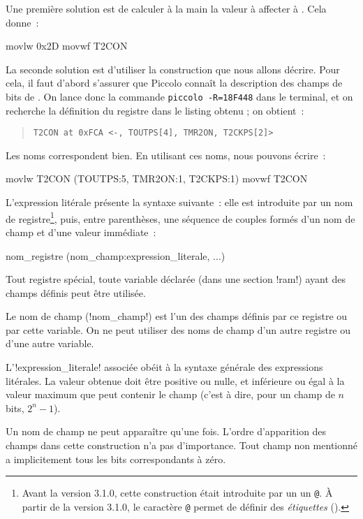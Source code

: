 Une première solution est de calculer à la main la valeur à affecter à . Cela donne~:
\begin{piccolo}
movlw   0x2D
movwf   T2CON
\end{piccolo}

La seconde solution est d'utiliser la construction que nous allons décrire. Pour cela, il faut d'abord s’assurer que Piccolo connaît la description des champs de bits de . On lance donc la commande \texttt{piccolo -R=18F448} dans le terminal, et on recherche la définition du registre  dans le listing obtenu ; on obtient~:
\begin{quote}
\texttt{\textquotesingle T2CON\textquotesingle~at 0xFCA <-, TOUTPS[4], TMR2ON, T2CKPS[2]>}
\end{quote}

Les noms correspondent bien. En utilisant ces noms, nous pouvons écrire~:
\begin{piccolo}
movlw   T2CON (TOUTPS:5, TMR2ON:1, T2CKPS:1)
movwf   T2CON
\end{piccolo}

L'expression litérale présente la syntaxe suivante~: elle est introduite par un nom de registre\footnote{Avant la version 3.1.0, cette construction était introduite par un un \texttt{@}. À partir de la version 3.1.0, le caractère \texttt{@} permet de définir des \emph{étiquettes} ().}, puis, entre parenthèses, une séquence de couples formés d’un nom de champ et d’une valeur immédiate~:
\begin{piccolo}
  nom_registre (nom_champ:expression_literale, ...)
\end{piccolo}

Tout registre spécial, toute variable déclarée (dans une section \pic!ram!) ayant des champs définis peut être utilisée.

Le nom de champ (\pic!nom_champ!) est l’un des champs définis par ce registre ou par cette variable. On ne peut utiliser des noms de champ d’un autre registre ou d’une autre variable.

L’\pic!expression_literale! associée obéit à la syntaxe générale des expressions litérales. La valeur obtenue doit être positive ou nulle, et inférieure ou égal à la valeur maximum que peut contenir le champ (c’est à dire, pour un champ de $n$ bits, $2^n-1$).

Un nom de champ ne peut apparaître qu’une fois. L’ordre d’apparition des champs dans cette construction n’a pas d’importance. Tout champ non mentionné a implicitement tous les bits correspondants à zéro.


